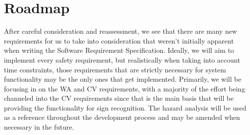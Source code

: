 \documentclass{article}
\begin{document}
\section{Roadmap}

After careful consideration and reassessment, we see that there are many new requirements for us to take into consideration that weren't initially apparent when writing the Software Requirement Specification. Ideally, we will aim to implement every safety requirement, but realistically when taking into account time constraints, those requirements that are strictly necessary for system functionality may be the only ones that get implemented. Primarily, we will be focusing in on the WA and CV requirements, with a majority of the effort being channeled into the CV requirements since that is the main basis that will be providing the functionality for sign recognition. The hazard analysis will be used as a reference throughout the development process and may be amended when necessary in the future.

\end{document}
